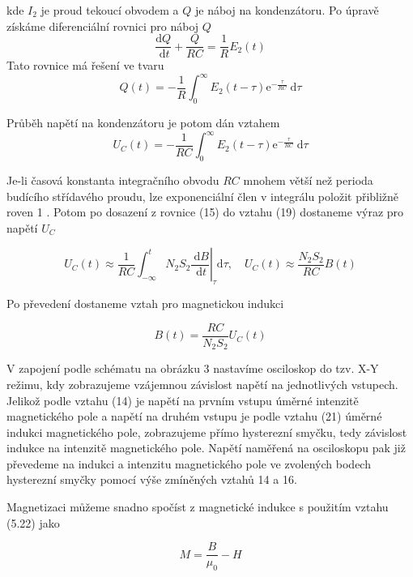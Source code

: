 \documentclass[czech,11pt,a4paper]{article}
\begin{document}
\begin{multicols}{2}
	kde $I_{2}$ je proud tekoucí obvodem a $Q$ je náboj na kondenzátoru. Po úpravě získáme diferenciální rovnici pro náboj $Q$
\begin{equation}
		\frac{\mathrm{d} Q}{\mathrm{~d} t}+\frac{Q}{R C}=\frac{1}{R} E_{2}(t)
\end{equation}
	Tato rovnice má řešení ve tvaru
	\begin{equation}
		Q(t)=-\frac{1}{R} \int_{0}^{\infty} E_{2}(t-\tau) \mathrm{e}^{-\frac{\tau}{R C}} \mathrm{~d} \tau
	\end{equation}
	
	
	Průběh napětí na kondenzátoru je potom dán vztahem
	\begin{equation}
		U_{C}(t)=-\frac{1}{R C} \int_{0}^{\infty} E_{2}(t-\tau) \mathrm{e}^{-\frac{\tau}{R C}} \mathrm{~d} \tau
	\end{equation}
	
	Je-li časová konstanta integračního obvodu $R C$ mnohem větší než perioda budícího střídavého proudu, lze exponenciální člen v integrálu položit přibližně roven 1 . Potom po dosazení z rovnice (15) do vztahu (19) dostaneme výraz pro napětí $U_{C}$
	
\begin{equation}
		\left.U_{C}(t) \approx \frac{1}{R C} \int_{-\infty}^{t} N_{2} S_{2} \frac{\mathrm{~d} B}{\mathrm{~d} t}\right|_{\tau} \mathrm{d} \tau, \quad U_{C}(t) \approx \frac{N_{2} S_{2}}{R C} B(t)
\end{equation}
	
	
	Po převedení dostaneme vztah pro magnetickou indukci
	
\begin{equation}
		B(t)=\frac{R C}{N_{2} S_{2}} U_{C}(t)
\end{equation}
	
	
	V zapojení podle schématu na obrázku 3 nastavíme osciloskop do tzv. X-Y režimu, kdy zobrazujeme vzájemnou závislost napětí na jednotlivých vstupech. Jelikož podle vztahu (14) je napětí na prvním vstupu úměrné intenzitě magnetického pole a napětí na druhém vstupu je podle vztahu (21) úměrné indukci magnetického pole, zobrazujeme přímo hysterezní smyčku, tedy závislost indukce na intenzitě magnetického pole. Napětí naměřená na osciloskopu pak již převedeme na indukci a intenzitu magnetického pole ve zvolených bodech hysterezní smyčky pomocí výše zmíněných vztahů 14 a 16.
		
	Magnetizaci můžeme snadno spočíst z magnetické indukce s použitím vztahu (5.22) jako
	
\begin{equation}
		M=\frac{B}{\mu_{0}}-H
\end{equation}
	


\end{multicols}
\end{document}
